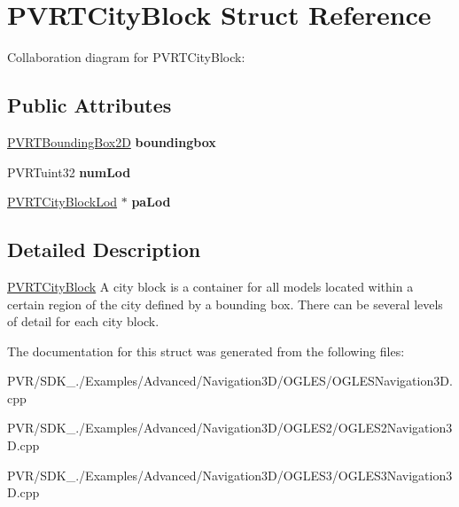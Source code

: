 \hypertarget{struct_p_v_r_t_city_block}{\section{P\+V\+R\+T\+City\+Block Struct Reference}
\label{struct_p_v_r_t_city_block}
}


Collaboration diagram for P\+V\+R\+T\+City\+Block\+:
\subsection*{Public Attributes}
\begin{DoxyCompactItemize}
\item 
\hypertarget{struct_p_v_r_t_city_block_a40ffccf3cf60459dc94e4dc69726c744}{\hyperlink{struct_p_v_r_t_bounding_box2_d}{P\+V\+R\+T\+Bounding\+Box2\+D} {\bfseries boundingbox}}\label{struct_p_v_r_t_city_block_a40ffccf3cf60459dc94e4dc69726c744}

\item 
\hypertarget{struct_p_v_r_t_city_block_a33cd780a69d0facabe3679a9724bba70}{P\+V\+R\+Tuint32 {\bfseries num\+Lod}}\label{struct_p_v_r_t_city_block_a33cd780a69d0facabe3679a9724bba70}

\item 
\hypertarget{struct_p_v_r_t_city_block_a9a0c82cc1fce054e793912fc1967c094}{\hyperlink{struct_p_v_r_t_city_block_lod}{P\+V\+R\+T\+City\+Block\+Lod} $\ast$ {\bfseries pa\+Lod}}\label{struct_p_v_r_t_city_block_a9a0c82cc1fce054e793912fc1967c094}

\end{DoxyCompactItemize}


\subsection{Detailed Description}


  \hyperlink{struct_p_v_r_t_city_block}{P\+V\+R\+T\+City\+Block}  A city block is a container for all models located within a certain region of the city defined by a bounding box. There can be several levels of detail for each city block. 

The documentation for this struct was generated from the following files\+:\begin{DoxyCompactItemize}
\item 
P\+V\+R/\+S\+D\+K\+\_./\+Examples/\+Advanced/\+Navigation3\+D/\+O\+G\+L\+E\+S/O\+G\+L\+E\+S\+Navigation3\+D.\+cpp\item 
P\+V\+R/\+S\+D\+K\+\_./\+Examples/\+Advanced/\+Navigation3\+D/\+O\+G\+L\+E\+S2/O\+G\+L\+E\+S2\+Navigation3\+D.\+cpp\item 
P\+V\+R/\+S\+D\+K\+\_./\+Examples/\+Advanced/\+Navigation3\+D/\+O\+G\+L\+E\+S3/O\+G\+L\+E\+S3\+Navigation3\+D.\+cpp\end{DoxyCompactItemize}
